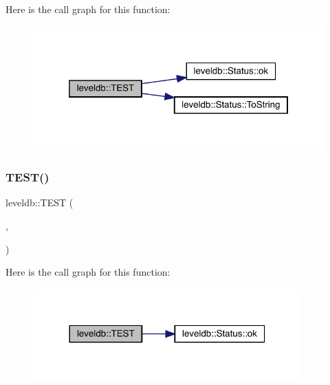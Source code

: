 Here is the call graph for this function\+:
\nopagebreak
\begin{figure}[H]
\begin{center}
\leavevmode
\includegraphics[width=319pt]{namespaceleveldb_a8e750f4502e214132281fd755d26c175_cgraph}
\end{center}
\end{figure}
\mbox{\label{namespaceleveldb_ab4a8284a6c982c710e6e84af0d6040a9}} 
\subsubsection{\texorpdfstring{TEST()}{TEST()}\hspace{0.1cm}{\footnotesize\ttfamily [98/102]}}
{\footnotesize\ttfamily leveldb\+::\+T\+E\+ST (\begin{DoxyParamCaption}\item[{\mbox{\hyperlink{classleveldb_1_1_d_b_test}{D\+B\+Test}}}]{,  }\item[{Still\+Read\+S\+ST}]{ }\end{DoxyParamCaption})}

Here is the call graph for this function\+:
\nopagebreak
\begin{figure}[H]
\begin{center}
\leavevmode
\includegraphics[width=293pt]{namespaceleveldb_ab4a8284a6c982c710e6e84af0d6040a9_cgraph}
\end{center}
\end{figure}
\mbox{\label{namespaceleveldb_a47755684dc15db851e0174ea9475e97c}} 
